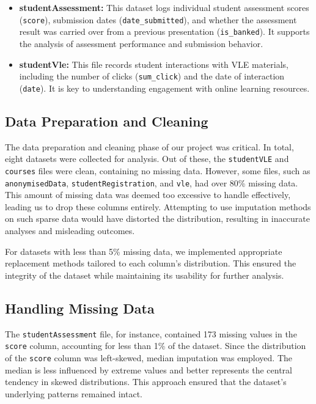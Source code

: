 \begin{itemize}
    \item \textbf{studentAssessment:} This dataset logs individual student assessment scores (\texttt{score}), submission dates (\texttt{date\_submitted}), and whether the assessment result was carried over from a previous presentation (\texttt{is\_banked}). It supports the analysis of assessment performance and submission behavior.

    \item \textbf{studentVle:} This file records student interactions with VLE materials, including the number of clicks (\texttt{sum\_click}) and the date of interaction (\texttt{date}). It is key to understanding engagement with online learning resources.

\end{itemize}

\subsection*{Data Preparation and Cleaning}

The data preparation and cleaning phase of our project was critical. In total, eight datasets were collected for analysis. Out of these, the \texttt{studentVLE} and \texttt{courses} files were clean, containing no missing data. However, some files, such as \texttt{anonymisedData}, \texttt{studentRegistration}, and \texttt{vle}, had over 80\% missing data. This amount of missing data was deemed too excessive to handle effectively, leading us to drop these columns entirely. Attempting to use imputation methods on such sparse data would have distorted the distribution, resulting in inaccurate analyses and misleading outcomes.

For datasets with less than 5\% missing data, we implemented appropriate replacement methods tailored to each column's distribution. This ensured the integrity of the dataset while maintaining its usability for further analysis.

\subsection*{Handling Missing Data}
The \texttt{studentAssessment} file, for instance, contained 173 missing values in the \texttt{score} column, accounting for less than 1\% of the dataset. Since the distribution of the \texttt{score} column was left-skewed, median imputation was employed. The median is less influenced by extreme values and better represents the central tendency in skewed distributions. This approach ensured that the dataset's underlying patterns remained intact.

